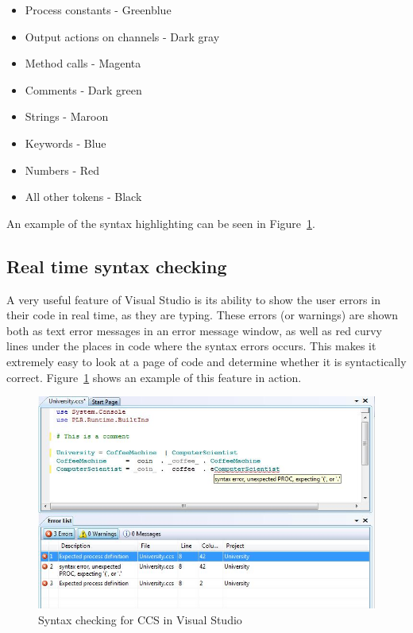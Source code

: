 	\begin{itemize}
		\item Process constants - Greenblue
		\item Output actions on channels	- Dark gray
		\item Method calls - Magenta
		\item Comments - Dark green
		\item Strings - Maroon
		\item Keywords - Blue
		\item Numbers - Red
		\item All other tokens - Black
	\end{itemize}

	An example of the syntax highlighting can be seen in 
	Figure~\ref{fig:syntaxcheck}.
	
	\subsection{Real time syntax checking}\label{sec:syntax_checking}
	A very useful feature of Visual Studio is its ability to show the user 
	errors in their code in real time, as they are typing. These errors (or 
	warnings) are shown both as text error messages in an error message window, 
	as well as red curvy lines under the places in code where the syntax errors 
	occurs. This makes it extremely easy to look at a page of code and determine 
	whether it is syntactically correct. Figure~\ref{fig:syntaxcheck} shows an 
	example of this feature in action.
	
	\begin{figure}[h!]
		\centering
		\includegraphics[scale=0.7]{syntaxcheck.jpg}
		\caption{Syntax checking for CCS in Visual Studio}
		\label{fig:syntaxcheck}
	\end{figure}

